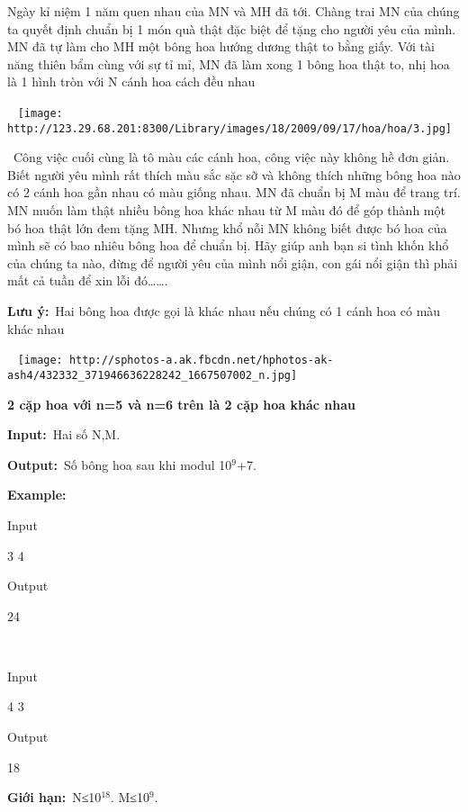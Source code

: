 

Ngày kỉ niệm 1 năm quen nhau của MN và MH đã tới. Chàng trai MN của chúng ta quyết định chuẩn bị 1 món quà thật đặc biệt để tặng cho người yêu của mình. MN đã tự làm cho MH một bông hoa hướng dương thật to bằng giấy. Với tài năng thiên bẩm cùng với sự tỉ mỉ, MN đã làm xong 1 bông hoa thật to, nhị hoa là 1 hình tròn với N cánh hoa cách đều nhau 

 
\texttt{[image: http://123.29.68.201:8300/Library/images/18/2009/09/17/hoa/hoa/3.jpg]}

 Công việc cuối cùng là tô màu các cánh hoa, công việc này không hề đơn giản. Biết người yêu mình rất thích màu sắc sặc sỡ và không thích những bông hoa nào có 2 cánh hoa gần nhau có màu giống nhau. MN đã chuẩn bị M màu để trang trí. MN muốn làm thật nhiều bông hoa khác nhau từ M màu đó để góp thành một bó hoa thật lớn đem tặng MH. Nhưng khổ nỗi MN không biết được bó hoa của mình sẽ có bao nhiêu bông hoa để chuẩn bị. Hãy giúp anh bạn si tình khốn khổ của chúng ta nào, đừng để người yêu của mình nổi giận, con gái nổi giận thì phải mất cả tuần để xin lỗi đó…….

\textbf{Lưu ý:} Hai bông hoa được gọi là khác nhau nếu chúng có 1 cánh hoa có màu khác nhau

 
\texttt{[image: http://sphotos-a.ak.fbcdn.net/hphotos-ak-ash4/432332\_371946636228242\_1667507002\_n.jpg]}

\textbf{2 cặp hoa với n=5 và n=6 trên là 2 cặp hoa khác nhau}

\textbf{Input:} Hai số N,M.

\textbf{Output:} Số bông hoa sau khi modul 10$^9$+7.

\textbf{Example:}

Input

3 4

Output

24

 

Input

4 3

Output

18

\textbf{Giới hạn:} N≤10$^18$. M≤10$^9$.